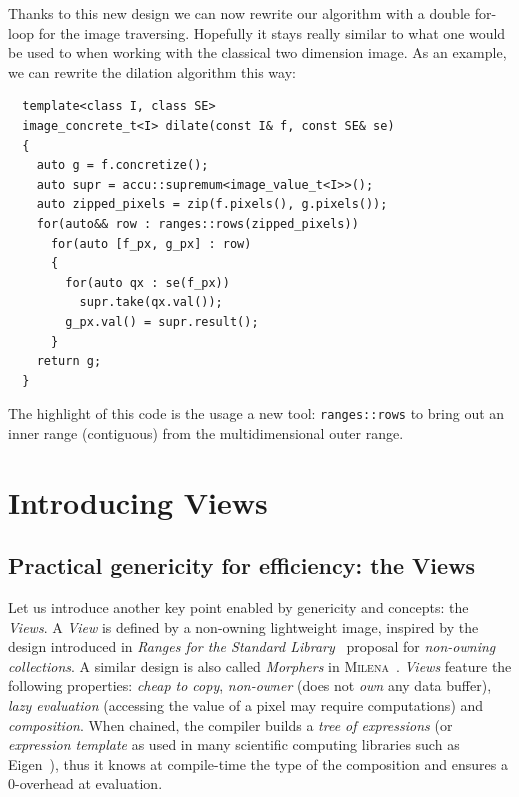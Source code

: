 Thanks to this new design we can now rewrite our algorithm with a double for-loop for the image traversing. Hopefully it
stays really similar to what one would be used to when working with the classical two dimension image. As an example, we
can rewrite the dilation algorithm this way:

\begin{verbatim}
  template<class I, class SE>
  image_concrete_t<I> dilate(const I& f, const SE& se)
  {
    auto g = f.concretize();
    auto supr = accu::supremum<image_value_t<I>>();
    auto zipped_pixels = zip(f.pixels(), g.pixels());
    for(auto&& row : ranges::rows(zipped_pixels))
      for(auto [f_px, g_px] : row)
      {
        for(auto qx : se(f_px))
          supr.take(qx.val());
        g_px.val() = supr.result();
      }
    return g;
  }
\end{verbatim}

The highlight of this code is the usage a new tool: \texttt{ranges::rows} to bring out an inner range (contiguous) from
the multidimensional outer range.


\section*{Introducing Views}
\label{sec.views}

\subsection*{Practical genericity for efficiency: the Views}
\label{subsec.views}

Let us introduce another key point enabled by genericity and concepts: the \emph{Views}. A \emph{View} is defined by a
non-owning lightweight image, inspired by the design introduced in \emph{Ranges for the Standard
  Library}~\parencite{niebler.2014.ranges} proposal for \emph{non-owning collections}. A similar design is also called
\emph{Morphers} in \textsc{Milena}~\parencite{levillain.2009.ismm, geraud.2012.hdr}. \emph{Views} feature the following
properties: \emph{cheap to copy}, \emph{non-owner} (does not \emph{own} any data buffer), \emph{lazy evaluation}
(accessing the value of a pixel may require computations) and \emph{composition}. When chained, the compiler builds a
\emph{tree of expressions} (or \emph{expression template} as used in many scientific computing libraries such as
Eigen~\cite{guennebaud.2010.eigen}), thus it knows at compile-time the type of the composition and ensures a 0-overhead
at evaluation.

